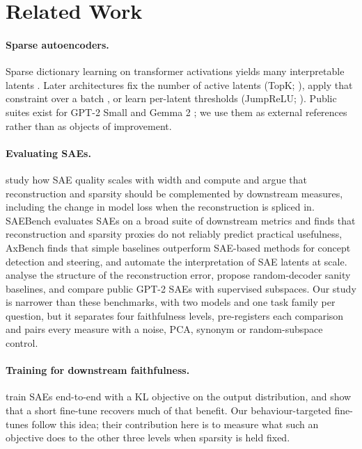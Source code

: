 \section{Related Work}\label{sec:related}

\paragraph{Sparse autoencoders.} Sparse dictionary learning on transformer activations yields many interpretable
latents \citep{bricken2023monosemanticity,cunningham2023sparse}. Later architectures fix the number of active latents
(TopK; \citealp{gao2024scaling}), apply that constraint over a batch \citep{bussmann2024batchtopk}, or learn per-latent
thresholds (JumpReLU; \citealp{rajamanoharan2024jumping}). Public suites exist for GPT-2 Small
\citep{bloom2024gpt2,saelens2024} and Gemma 2 \citep{gemmascope2024}; we use them as external references rather than
as objects of improvement.

\paragraph{Evaluating SAEs.} \citet{gao2024scaling} study how SAE quality scales with width and compute and argue that
reconstruction and sparsity should be complemented by downstream measures, including the change in model loss when the
reconstruction is spliced in. SAEBench \citep{karvonen2025saebench} evaluates SAEs on a broad suite of downstream
metrics and finds that reconstruction and sparsity proxies do not reliably predict practical usefulness, AxBench
\citep{wu2025axbench} finds that simple baselines outperform SAE-based methods for concept detection and steering, and
\citet{paulo2024automatic} automate the interpretation of SAE latents at scale. \citet{engels2024darkmatter} analyse the
structure of the reconstruction error, \citet{korznikov2026random} propose random-decoder sanity baselines, and
\citet{chaudhary2024evaluating} compare public GPT-2 SAEs with supervised subspaces. Our study is narrower than these
benchmarks, with two models and one task family per question, but it separates four faithfulness levels, pre-registers
each comparison and pairs every measure with a noise, PCA, synonym or random-subspace control.

\paragraph{Training for downstream faithfulness.} \citet{braun2024e2e} train SAEs end-to-end with a KL objective on the
output distribution, and \citet{karvonen2025kl} show that a short fine-tune recovers much of that benefit. Our
behaviour-targeted fine-tunes follow this idea; their contribution here is to measure what such an objective does to
the other three levels when sparsity is held fixed.


